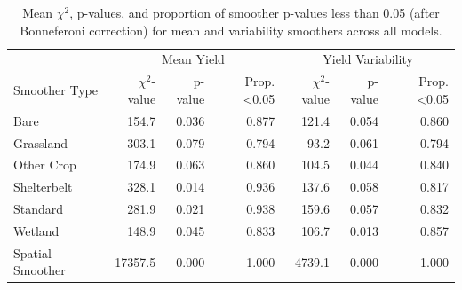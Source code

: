 \documentclass[]{elsarticle} %
\begin{document}
\begin{table}

\caption{Mean $\chi^2$, p-values, and proportion of smoother p-values less than 0.05 (after Bonneferoni correction) for mean and variability smoothers across all models.}
\centering
\begin{tabular}[H]{l|r|r|r|r|r|r}
\hline
\multicolumn{1}{c|}{} & \multicolumn{3}{c|}{Mean Yield} & \multicolumn{3}{c}{Yield Variability} \\
\cline{2-4} \cline{5-7}
Smoother Type & $\chi^2$-value & p-value & Prop. <0.05 & $\chi^2$-value & p-value & Prop. <0.05\\
\hline
Bare & 154.7 & 0.036 & 0.877 & 121.4 & 0.054 & 0.860\\
\hline
Grassland & 303.1 & 0.079 & 0.794 & 93.2 & 0.061 & 0.794\\
\hline
Other Crop & 174.9 & 0.063 & 0.860 & 104.5 & 0.044 & 0.840\\
\hline
Shelterbelt & 328.1 & 0.014 & 0.936 & 137.6 & 0.058 & 0.817\\
\hline
Standard & 281.9 & 0.021 & 0.938 & 159.6 & 0.057 & 0.832\\
\hline
Wetland & 148.9 & 0.045 & 0.833 & 106.7 & 0.013 & 0.857\\
\hline
Spatial Smoother & 17357.5 & 0.000 & 1.000 & 4739.1 & 0.000 & 1.000\\
\hline
\end{tabular}
\end{table}
\end{document}
